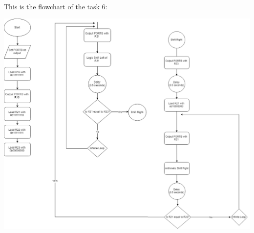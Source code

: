 \documentclass[a4paper,12pt]{article}
\begin{document}
\newpage
This is the flowchart of the task 6:
\begin{center}
\includegraphics[scale=0.7]{img/Task6.png} 
\end{center}



\end{document}
